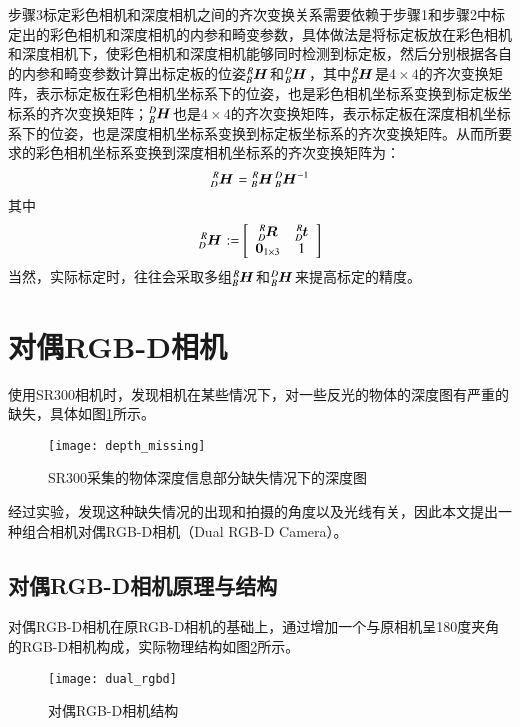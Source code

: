 步骤3标定彩色相机和深度相机之间的齐次变换关系需要依赖于步骤1和步骤2中标定出的彩色相机和深度相机的内参和畸变参数，具体做法是将标定板放在彩色相机和深度相机下，使彩色相机和深度相机能够同时检测到标定板，然后分别根据各自的内参和畸变参数计算出标定板的位姿$\tensor*[^R_B]{\bm{H}}{}$和$\tensor*[^D_B]{\bm{H}}{}$，其中$\tensor*[^R_B]{\bm{H}}{}$是$4\times 4$的齐次变换矩阵，表示标定板在彩色相机坐标系下的位姿，也是彩色相机坐标系变换到标定板坐标系的齐次变换矩阵；$\tensor*[^D_B]{\bm{H}}{}$也是$4\times 4$的齐次变换矩阵，表示标定板在深度相机坐标系下的位姿，也是深度相机坐标系变换到标定板坐标系的齐次变换矩阵。从而所要求的彩色相机坐标系变换到深度相机坐标系的齐次变换矩阵为：
\begin{equation}
  \tensor*[^R_D]{\bm{H}}{} = \tensor*[^R_B]{\bm{H}}{}\tensor*[^D_B]{\bm{H}}{^{-1}}
\end{equation}
其中
\begin{equation}
  \tensor*[^R_D]{\bm{H}}{} := \left[
    \begin{array}{cc}
      \tensor*[^R_D]{\bm{R}}{}& \tensor*[^R_D]{\bm{t}}{}\\
      \bm{0}_{1\times 3}&1
    \end{array}
\right]
\end{equation}
当然，实际标定时，往往会采取多组$\tensor*[^R_B]{\bm{H}}{}$和$\tensor*[^D_B]{\bm{H}}{}$来提高标定的精度。

\section{对偶RGB-D相机}
使用SR300相机时，发现相机在某些情况下，对一些反光的物体的深度图有严重的缺失，具体如图\ref{fig:depth_missing}所示。
\begin{figure}[!ht]
  \centering
  \texttt{[image: depth\_missing]}
  \caption{SR300采集的物体深度信息部分缺失情况下的深度图}
  \label{fig:depth_missing}
\end{figure}
经过实验，发现这种缺失情况的出现和拍摄的角度以及光线有关，因此本文提出一种组合相机对偶RGB-D相机（Dual RGB-D Camera）。

\subsection{对偶RGB-D相机原理与结构}
对偶RGB-D相机在原RGB-D相机的基础上，通过增加一个与原相机呈180度夹角的RGB-D相机构成，实际物理结构如图\ref{fig:dual_rgbd}所示。
\begin{figure}[!ht]
  \centering
  \texttt{[image: dual\_rgbd]}
  \caption{对偶RGB-D相机结构}
  \label{fig:dual_rgbd}
\end{figure}

